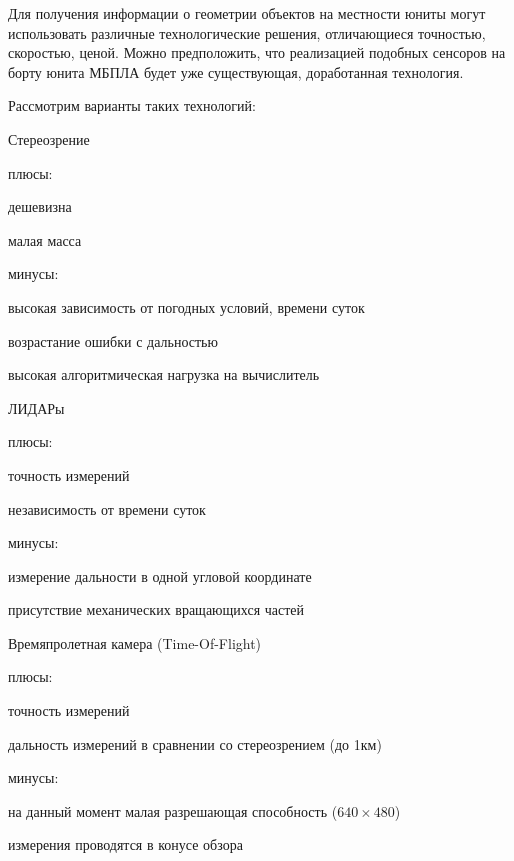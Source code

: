 Для получения информации о геометрии объектов на местности юниты могут
использовать различные технологические решения, отличающиеся точностью,
скоростью, ценой. Можно предположить, что реализацией подобных сенсоров на
борту юнита МБПЛА будет уже существующая, доработанная технология.

Рассмотрим варианты таких технологий:

\begin{mintemize}
\item Стереозрение

    плюсы:
    \begin{mintemize}
    \item дешевизна
    \item малая масса
    \end{mintemize}
    минусы:
    \begin{mintemize}
    \item высокая зависимость от погодных условий, времени суток
    \item возрастание ошибки с дальностью
    \item высокая алгоритмическая нагрузка на вычислитель
    \end{mintemize}
\item ЛИДАРы

    плюсы:
    \begin{mintemize}
    \item точность измерений
    \item независимость от времени суток
    \end{mintemize}
    минусы:
    \begin{mintemize}
    \item измерение дальности в одной угловой координате
    \item присутствие механических вращающихся частей
    \end{mintemize}

\item Времяпролетная камера (Time-Of-Flight)

    плюсы:
    \begin{mintemize}
    \item точность измерений
    \item дальность измерений в сравнении со стереозрением (до 1км)
    \end{mintemize}
    минусы:
    \begin{mintemize}
    \item на данный момент малая разрешающая способность ($640 \times 480$)
    \item измерения проводятся в конусе обзора
    \end{mintemize}
\end{mintemize}


